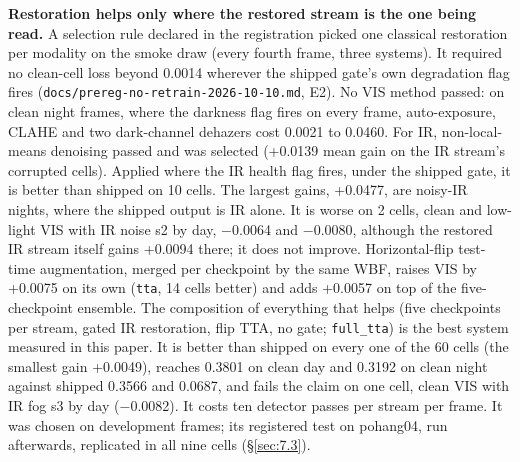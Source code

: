 \documentclass[10pt]{article}
\begin{document}
\textbf{Restoration helps only where the restored stream is the one being read.} A selection rule declared in the registration picked one classical restoration per modality on the smoke draw (every fourth frame, three systems). It required no clean-cell loss beyond 0.0014 wherever the shipped gate's own degradation flag fires (\texttt{docs/\allowbreak{}prereg-no-retrain-2026-10-10.md}, E2). No VIS method passed: on clean night frames, where the darkness flag fires on every frame, auto-exposure, CLAHE and two dark-channel dehazers cost 0.0021 to 0.0460. For IR, non-local-means denoising passed and was selected (+0.0139 mean gain on the IR stream's corrupted cells). Applied where the IR health flag fires, under the shipped gate, it is better than shipped on 10 cells. The largest gains, +0.0477, are noisy-IR nights, where the shipped output is IR alone. It is worse on 2 cells, clean and low-light VIS with IR noise s2 by day, $-$0.0064 and $-$0.0080, although the restored IR stream itself gains +0.0094 there; it does not improve. Horizontal-flip test-time augmentation, merged per checkpoint by the same WBF, raises VIS by +0.0075 on its own (\texttt{tta}, 14 cells better) and adds +0.0057 on top of the five-checkpoint ensemble. The composition of everything that helps (five checkpoints per stream, gated IR restoration, flip TTA, no gate; \texttt{full\_\allowbreak{}tta}) is the best system measured in this paper. It is better than shipped on every one of the 60 cells (the smallest gain +0.0049), reaches 0.3801 on clean day and 0.3192 on clean night against shipped 0.3566 and 0.0687, and fails the claim on one cell, clean VIS with IR fog s3 by day ($-$0.0082). It costs ten detector passes per stream per frame. It was chosen on development frames; its registered test on pohang04, run afterwards, replicated in all nine cells (\S\ref{sec:7.3}).
\end{document}
